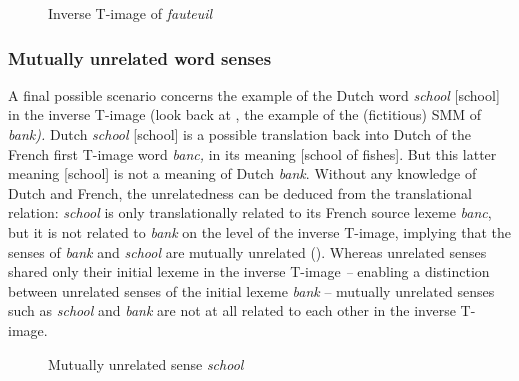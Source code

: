 \begin{figure}
\caption{\label{fig:3:13}  Inverse T-image of \textit{fauteuil}}
\end{figure}

\subsubsection{Mutually unrelated word senses}
\label{sec:3.4.3.3}
A final possible scenario concerns the example of the Dutch word \textit{school} [school] in the inverse T-image (look back at , the example of the (fictitious) SMM of \textit{bank).} Dutch \textit{school} [school] is a possible translation back into Dutch of the French first T-image word \textit{banc,} in its meaning [school of fishes]. But this latter meaning [school] is not a meaning of Dutch \textit{bank}. Without any knowledge of Dutch and French, the unrelatedness can be deduced from the translational relation: \textit{school} is only translationally related to its French source lexeme \textit{banc}, but it is not related to \textit{bank} on the level of the inverse T-image, implying that the senses of \textit{bank} and \textit{school} are mutually unrelated (). Whereas unrelated senses shared only their initial lexeme in the inverse T-image \textit{–} enabling a distinction between unrelated senses of the initial lexeme \textit{bank} -- mutually unrelated senses such as \textit{school} and \textit{bank} are not at all related to each other in the inverse T-image.

\begin{figure}
\caption{\label{fig:3:14}  Mutually unrelated sense \textit{school}}
\end{figure}

